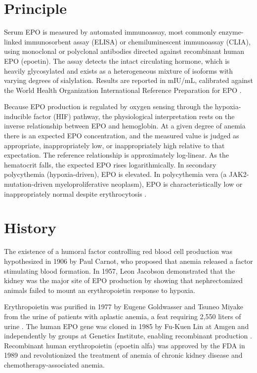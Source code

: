 \section*{Principle}
Serum EPO is measured by automated immunoassay, most commonly enzyme-linked immunosorbent assay (ELISA) or chemiluminescent immunoassay (CLIA), using monoclonal or polyclonal antibodies directed against recombinant human EPO (epoetin). The assay detects the intact circulating hormone, which is heavily glycosylated and exists as a heterogeneous mixture of isoforms with varying degrees of sialylation. Results are reported in mIU/mL, calibrated against the World Health Organization International Reference Preparation for EPO \cite{tietz2023textbook}.

Because EPO production is regulated by oxygen sensing through the hypoxia-inducible factor (HIF) pathway, the physiological interpretation rests on the inverse relationship between EPO and hemoglobin. At a given degree of anemia there is an expected EPO concentration, and the measured value is judged as appropriate, inappropriately low, or inappropriately high relative to that expectation. The reference relationship is approximately log-linear. As the hematocrit falls, the expected EPO rises logarithmically. In secondary polycythemia (hypoxia-driven), EPO is elevated. In polycythemia vera (a JAK2-mutation-driven myeloproliferative neoplasm), EPO is characteristically low or inappropriately normal despite erythrocytosis \cite{kralovics2005gain}.

\section*{History}
The existence of a humoral factor controlling red blood cell production was hypothesized in 1906 by Paul Carnot, who proposed that anemia released a factor stimulating blood formation. In 1957, Leon Jacobson demonstrated that the kidney was the major site of EPO production by showing that nephrectomized animals failed to mount an erythropoietin response to hypoxia.

Erythropoietin was purified in 1977 by Eugene Goldwasser and Tsuneo Miyake from the urine of patients with aplastic anemia, a feat requiring 2,550 liters of urine \cite{miyake1977purification}. The human EPO gene was cloned in 1985 by Fu-Kuen Lin at Amgen and independently by groups at Genetics Institute, enabling recombinant production \cite{lin1985cloning}. Recombinant human erythropoietin (epoetin alfa) was approved by the FDA in 1989 and revolutionized the treatment of anemia of chronic kidney disease and chemotherapy-associated anemia.

